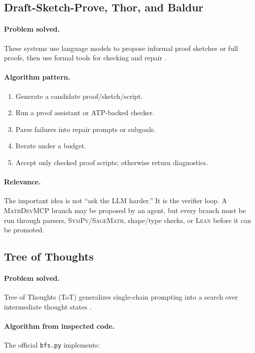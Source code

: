 \documentclass[11pt]{article}
\newcommand{\MathDevMCP}{\textsc{MathDevMCP}}
\newcommand{\Lean}{\textsc{Lean}}
\newcommand{\Sage}{\textsc{SageMath}}
\newcommand{\SymPy}{\textsc{SymPy}}
\begin{document}
\subsection{Draft-Sketch-Prove, Thor, and Baldur}

\paragraph{Problem solved.}
These systems use language models to propose informal proof sketches or full
proofs, then use formal tools for checking and repair
\cite{jiang2022draft,jiang2022thor,first2023baldur}.

\paragraph{Algorithm pattern.}

\begin{enumerate}[leftmargin=*]
\item Generate a candidate proof/sketch/script.
\item Run a proof assistant or ATP-backed checker.
\item Parse failures into repair prompts or subgoals.
\item Iterate under a budget.
\item Accept only checked proof scripts; otherwise return diagnostics.
\end{enumerate}

\paragraph{Relevance.}
The important idea is not ``ask the LLM harder.'' It is the verifier loop. A
\MathDevMCP{} branch may be proposed by an agent, but every branch must be run
through parsers, \SymPy/\Sage, shape/type checks, or \Lean{} before it can be
promoted.

\subsection{Tree of Thoughts}

\paragraph{Problem solved.}
Tree of Thoughts (ToT) generalizes single-chain prompting into a search over
intermediate thought states \cite{yao2023tot}.

\paragraph{Algorithm from inspected code.}
The official \texttt{bfs.py} implements:
\end{document}

